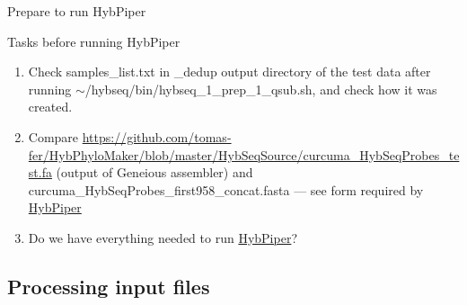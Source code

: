 \documentclass[compress, ucs, xelatex, 11pt, xcolor=x11names, aspectratio=169,
	hyperref={
		bookmarks=true,
		unicode=true,
		colorlinks=true,
		pdftitle={HybSeq course},
		plainpages=false,
		pdfauthor={Vojtech Zeisek},
		pdfsubject={Practical processing of HybSeq target enrichment sequencing data on computing grids like MetaCentrum},
		pdfcreator={XeLaTeX},
		pdfkeywords={BASH, command line, GNU, HybSeq, Linux, MetaCentrum, sequencing shell, target enrichment},
		linkcolor=Turquoise4, %
		anchorcolor=DodgerBlue4, %
		citecolor=DodgerBlue4, %
		filecolor=DodgerBlue4, %
		menucolor=Tan4, %
		urlcolor=DarkOliveGreen4, %
		pdftex},
	url={hyphens, lowtilde} %
	]{beamer}
\renewcommand{\texttt}[1]{\colorbox{Cornsilk2}{{\ttfamily #1}}}
\begin{document}
\begin{frame}{Prepare to run HybPiper}
	\begin{exampleblock}{Tasks before running HybPiper}
		\begin{enumerate}
			\item Check \texttt{samples\_list.txt} in \texttt{2\_dedup} output directory of the test data after running \texttt{$\sim$/hybseq/bin/hybseq\_1\_prep\_1\_qsub.sh}, and check how it was created.
			\item Compare \url{https://github.com/tomas-fer/HybPhyloMaker/blob/master/HybSeqSource/curcuma_HybSeqProbes_test.fa} (output of Geneious assembler) and \texttt{curcuma\_HybSeqProbes\_first958\_concat.fasta} --- see form required by \href{https://github.com/mossmatters/HybPiper/wiki\#12-target-file}{HybPiper}
			\item Do we have everything needed to run \href{https://github.com/mossmatters/HybPiper/wiki}{HybPiper}?
		\end{enumerate}
	\end{exampleblock}
\end{frame}

\subsection{Processing input files}
\end{document}
